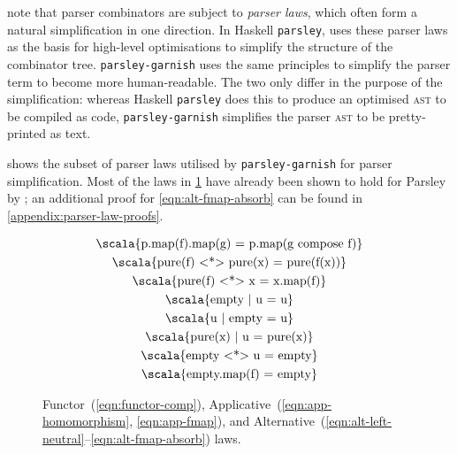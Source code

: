 \documentclass[../../main.tex]{subfiles}
\begin{document}
\textcite{willis_staged_2023} note that parser combinators are subject to \emph{parser laws}, which often form a natural simplification in one direction.
In Haskell \texttt{parsley}, \textcite{willis_parsley_2023} uses these parser laws as the basis for high-level optimisations to simplify the structure of the combinator tree.
\texttt{parsley-garnish} uses the same principles to simplify the parser term to become more human-readable.
The two only differ in the purpose of the simplification: whereas Haskell \texttt{parsley} does this to produce an optimised \textsc{ast} to be compiled as code, \texttt{parsley-garnish} simplifies the parser \textsc{ast} to be pretty-printed as text.

 shows the subset of parser laws utilised by \texttt{parsley-garnish} for parser simplification.
Most of the laws in \cref{fig:parser-laws} have already been shown to hold for Parsley by \textcite{willis_garnishing_2018}; an additional proof for \cref{eqn:alt-fmap-absorb} can be found in \cref{appendix:parser-law-proofs}.

\begin{figure}[htbp]
\centering
\begin{gather}
  \text{\scala{p.map(f).map(g) = p.map(g compose f)}} \label{eqn:functor-comp} \\
  \text{\scala{pure(f) <*> pure(x) = pure(f(x))}} \label{eqn:app-homomorphism} \\
  \text{\scala{pure(f) <*> x = x.map(f)}} \label{eqn:app-fmap} \\
  \text{\scala{empty | u = u}} \label{eqn:alt-left-neutral} \\
  \text{\scala{u | empty = u}} \label{eqn:alt-right-neutral} \\
  \text{\scala{pure(x) | u = pure(x)}} \label{eqn:alt-left-biased-choice} \\
  \text{\scala{empty <*> u = empty}} \label{eqn:alt-empty-absorb} \\
  \text{\scala{empty.map(f) = empty}} \label{eqn:alt-fmap-absorb}
\end{gather}
\caption{Functor~(\ref{eqn:functor-comp}), Applicative~(\ref{eqn:app-homomorphism}, \ref{eqn:app-fmap}), and Alternative~(\ref{eqn:alt-left-neutral}--\ref{eqn:alt-fmap-absorb}) laws.}
\label{fig:parser-laws}
\end{figure}
\end{document}

